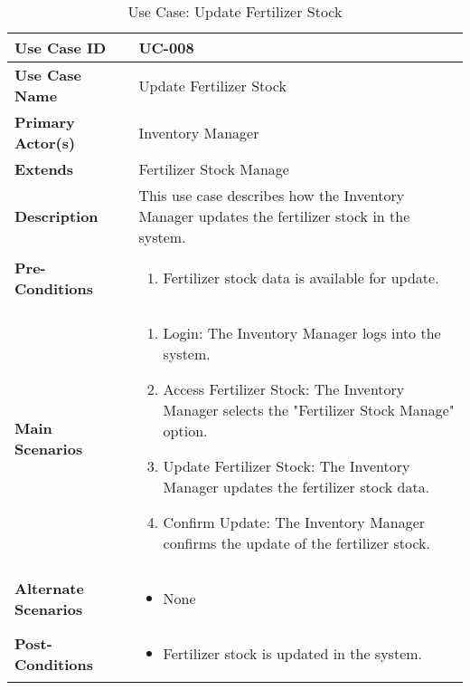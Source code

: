 \documentclass{article}
\begin{document}
\begin{table}[!ht]
    \centering
    \renewcommand{\arraystretch}{1.3} %
    \begin{tabularx}{\textwidth}{|l|X|}
        \hline
        \textbf{Use Case ID} & UC-008 \\
        \hline
        \textbf{Use Case Name} & Update Fertilizer Stock \\
        \hline
        \textbf{Primary Actor(s)} & Inventory Manager \\
        \hline
        \textbf{Extends} & Fertilizer Stock Manage \\
        \hline
        \textbf{Description} & This use case describes how the Inventory Manager updates the fertilizer stock in the system. \\
        \hline
        \textbf{Pre-Conditions} & 
        \begin{enumerate}[label=\arabic*.,itemsep=0pt]
            \item Fertilizer stock data is available for update.
        \end{enumerate} \\
        \hline
        \textbf{Main Scenarios} & 
        \begin{enumerate}[label=\arabic*.,itemsep=0pt]
            \item Login: The Inventory Manager logs into the system.
            \item Access Fertilizer Stock: The Inventory Manager selects the "Fertilizer Stock Manage" option.
            \item Update Fertilizer Stock: The Inventory Manager updates the fertilizer stock data.
            \item Confirm Update: The Inventory Manager confirms the update of the fertilizer stock.
        \end{enumerate} \\
        \hline
        \textbf{Alternate Scenarios} & 
        \begin{itemize}[label=--,itemsep=0pt]
            \item None
        \end{itemize} \\
        \hline
        \textbf{Post-Conditions} & 
        \begin{itemize}[label=--,itemsep=0pt]
            \item Fertilizer stock is updated in the system.
        \end{itemize} \\
        \hline
    \end{tabularx}
    \caption{Use Case: Update Fertilizer Stock}
    \label{tab:use-case-update-fertilizer-stock}
\end{table}
\end{document}
